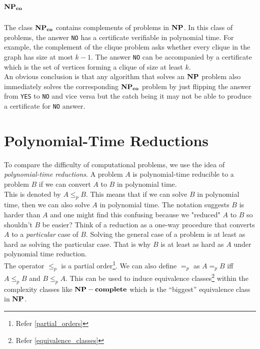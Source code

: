 \section*{$\mathbf{NP_{co}}$}

The class $\mathbf{NP_{co}}$ contains complements of problems in $\mathbf{NP}$. In this class of problems, the answer \texttt{NO} has a 
certificate verifiable in polynomial time. For example, the complement of the clique problem asks 
whether every clique in the graph has size at most $k-1$. The answer \texttt{NO} can be accompanied by a 
certificate which is the set of vertices forming a clique of size at least $k$.\\

\noindent An obvious conclusion is that any algorithm that solves an $\mathbf{NP}$ problem also 
immediately solves the corresponding $\mathbf{NP_{co}}$ problem by just flipping the answer from \texttt{YES} to \texttt{NO} 
and vice versa but the catch being it may not be able to produce a certificate for \texttt{NO} answer. 

\section{Polynomial-Time Reductions}

To compare the difficulty of computational problems, we use the idea of \emph{polynomial-time reductions}. A 
problem $A$ is polynomial-time reducible to a problem $B$ if we can convert $A$ to $B$ in polynomial time.\\

This is denoted by $A \le_p B$. This means that if we can solve $B$ in polynomial time, then we can 
also solve $A$ in polynomial time. The notation suggests $B$ is harder than $A$ and one might find 
this confusing because we "reduced" $A$ to $B$ so shouldn't $B$ be easier? Think of a reduction as a 
one-way procedure that converts $A$ to a \emph{particular} case of $B$. Solving the 
general case of a problem is at least as hard as solving the particular case. That is why $B$ is 
at least as hard as $A$ under polynomial time reduction.\\

The operator $\le_p$ is a partial order\footnote{Refer \autoref{partial_orders}}. We can also 
define $=_p$ as $A=_pB$ iff $A\le_pB$ and $B\le_pA$. This can be used to induce equivalence 
classes\footnote{Refer \autoref{equivalence_classes}} within the complexity classes like $\mathbf{NP-complete}$ 
which is the ``biggest'' equivalence class in $\mathbf{NP}$.

